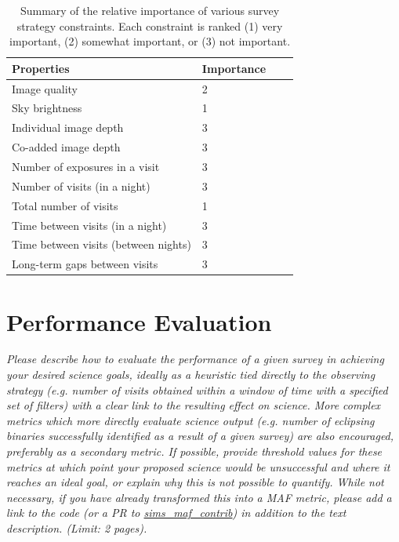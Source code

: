 \documentclass[12pt, letterpaper]{article}
\begin{document}
\begin{table}[ht]
    \centering
    \begin{tabular}{|l|l|l|l|}
        \hline
        Properties & Importance \hspace{.3in} \\
        \hline
        Image quality & 2\\
        Sky brightness & 1\\
        Individual image depth & 3\\
        Co-added image depth & 3\\
        Number of exposures in a visit & 3\\
        Number of visits (in a night) & 3\\ 
        Total number of visits & 1\\
        Time between visits (in a night) & 3\\
        Time between visits (between nights)  & 3\\
        Long-term gaps between visits & 3\\
        \hline
    \end{tabular}
    \caption{Summary of the relative importance of various survey strategy constraints. Each constraint is ranked (1) very important, (2) somewhat important, or (3) not important.}
        \label{tab:obs_constraints}
\end{table}

\section{Performance Evaluation}
\begin{footnotesize}
{\it Please describe how to evaluate the performance of a given survey in achieving your desired
science goals, ideally as a heuristic tied directly to the observing strategy (e.g. number of visits obtained
within a window of time with a specified set of filters) with a clear link to the resulting effect on science.
More complex metrics which more directly evaluate science output (e.g. number of eclipsing binaries successfully
identified as a result of a given survey) are also encouraged, preferably as a secondary metric.
If possible, provide threshold values for these metrics at which point your proposed science would be unsuccessful 
and where it reaches an ideal goal, or explain why this is not possible to quantify. While not necessary, 
if you have already transformed this into a MAF metric, please add a link to the code (or a PR to 
\href{https://github.com/lsst-nonproject/sims_maf_contrib}{sims\_maf\_contrib}) in addition to the text description. (Limit: 2 pages).}
\end{footnotesize}
\end{document}
